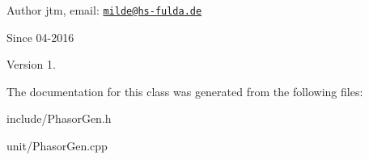 \begin{DoxyAuthor}{Author}
jtm, email\-:  \href{mailto:milde@hs-fulda.de}{\tt milde@hs-\/fulda.\-de} 
\end{DoxyAuthor}
\begin{DoxySince}{Since}
04-\/2016 
\end{DoxySince}
\begin{DoxyVersion}{Version}
1. 
\end{DoxyVersion}


The documentation for this class was generated from the following files\-:\begin{DoxyCompactItemize}
\item 
include/Phasor\-Gen.\-h\item 
unit/Phasor\-Gen.\-cpp\end{DoxyCompactItemize}
